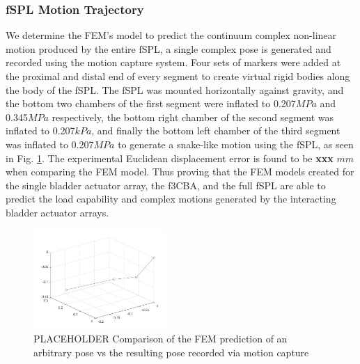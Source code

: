 \documentclass[letterpaper, 10 pt, conference]{ieeeconf}  %
\begin{document}
\subsubsection{fSPL Motion Trajectory}

We determine the FEM’s model to predict the continuum complex non-linear motion produced by the entire fSPL, a single complex pose is generated and recorded using the motion capture system. Four sets of markers were added at the proximal and distal end of every segment to create virtual rigid bodies along the body of the fSPL. The fSPL was mounted horizontally against gravity, and the bottom two chambers of the first segment were inflated to 0.207$MPa$ and 0.345$MPa$ respectively, the bottom right chamber of the second segment was inflated to 0.207$kPa$, and finally the bottom left chamber of the third segment was inflated to 0.207$MPa$ to generate a snake-like motion using the fSPL, as seen in Fig. \ref{fig:pose}. The experimental Euclidean displacement error is found to be \textbf{xxx} $mm$ when comparing the FEM model. Thus proving that the FEM models created for the single bladder actuator array, the f3CBA, and the full fSPL are able to predict the load capability and complex motions generated by the interacting bladder actuator arrays.

\begin{figure}[t!]
\centering
\includegraphics[width=0.45\textwidth]{Figures/SnakePose.jpg}
\caption{PLACEHOLDER Comparison of the FEM prediction of an arbitrary pose vs the resulting pose recorded via motion capture}
\label{fig:pose}
\end{figure}





\end{document}
